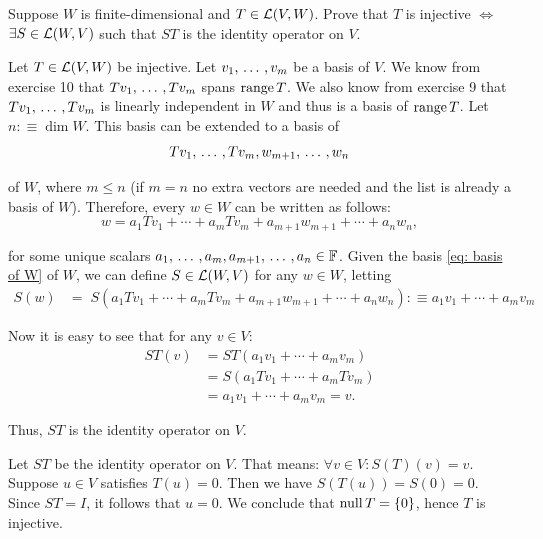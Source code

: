\begin{xrcs}
  Suppose $W$ is finite-dimensional and $T\in \mathcal{L}(V,W)$. Prove that $T$ is injective $\iff$ $\exists S \in \mathcal{L}(W,V)$ such that $ST$ is the identity operator on $V$.

  \begin{xprf}
    \Rightarrowdirection Let $T \in \mathcal{L} (V,W)$ be injective. Let $v_1, {\, \ldots \,\,}, v_m$ be a basis of $V$. We know from exercise 10 that $T v_1, {\, \ldots \,\,}, Tv_m$ spans $\operatorname{range} T$. We also know from exercise 9 that $T v_1, {\, \ldots \,\,}, Tv_m$ is linearly independent in $W$ and thus is a basis of $\operatorname{range} T$. Let $n :\equiv \dim W$. This basis can be extended to a basis of
    \begin{equation}
      \label{eq: basis of W}
      T v_1, {\, \ldots \,\,}, Tv_m, w_{m+1}, {\, \ldots \,\,}, w_n
    \end{equation}

    of $W$, where $m \leq n$ (if $m = n$ no extra vectors are needed and the list is already a basis of $W$). Therefore, every $w \in W$ can be written as follows:
    \begin{equation}
      w = a_1 T v_1 + \cdots + a_m T v_m + a_{m+1} w_{m+1} + \cdots + a_{n} w_n,
    \end{equation}

    for some unique scalars $a_1, {\, \ldots \,\,}, a_m, a_{m+1}, {\, \ldots \,\,}, a_n \in \mathbb{F}$. Given the basis \eqref{eq: basis of W} of $W$, we can define $S \in \mathcal{L} (W,V)$ for any $w \in W$, letting
    \begin{equation}
      \begin{aligned}
        S(w) &= \;  S(a_1 T v_1 + \cdots + a_m T v_m + a_{m+1} w_{m+1} + \cdots + a_{n} w_n)
        :\equiv a_1 v_1 + \cdots + a_m v_m
      \end{aligned}
    \end{equation}

    Now it is easy to see that for any $v \in V$:
    \begin{equation}
      \begin{aligned}
        ST(v) &= ST(a_1 v_1 + \cdots + a_m v_m) \\
        &= S(a_1 T v_1 + \cdots + a_m T v_m) \\
        &= a_1 v_1 + \cdots + a_m v_m = v.
      \end{aligned}
    \end{equation}

    Thus, $ST$ is the identity operator on $V$.

    \Leftarrowdirection Let $ST$ be the identity operator on $V$. That means: $\forall v \in V: S(T)(v) = v$. Suppose $u \in V$ satisfies $T(u) = 0$. Then we have $S(T(u)) = S(0) = 0$. Since $ST = I$, it follows that $u = 0$. We conclude that $\operatorname{null} T = \{0\}$, hence $T$ is injective.
  \end{xprf}
\end{xrcs}

